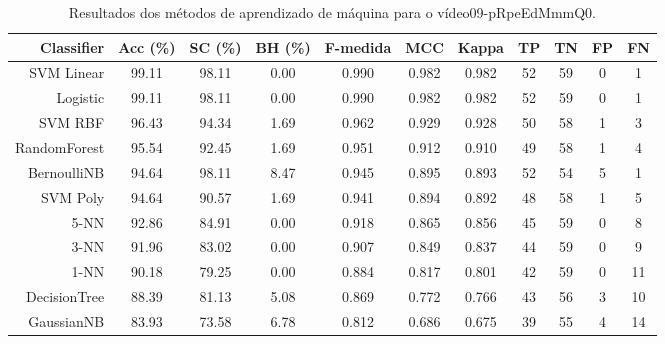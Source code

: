 \begin{table}[!htb]
\centering
\caption{Resultados dos métodos de aprendizado de máquina para o vídeo09-pRpeEdMmmQ0.}
\label{tab:09-pRpeEdMmmQ0}
\begin{tabular}{r|c|c|c|c|c|c|c|c|c|c}
\hline\hline
Classifier & Acc (\%) & SC (\%) & BH (\%) & F-medida & MCC & Kappa & TP & TN & FP & FN \\ \hline
SVM Linear & 99.11 & 98.11 & 0.00 & 0.990 & 0.982 & 0.982 & 52 & 59 & 0 & 1 \\ 
Logistic & 99.11 & 98.11 & 0.00 & 0.990 & 0.982 & 0.982 & 52 & 59 & 0 & 1 \\ 
SVM RBF & 96.43 & 94.34 & 1.69 & 0.962 & 0.929 & 0.928 & 50 & 58 & 1 & 3 \\ 
RandomForest & 95.54 & 92.45 & 1.69 & 0.951 & 0.912 & 0.910 & 49 & 58 & 1 & 4 \\ 
BernoulliNB & 94.64 & 98.11 & 8.47 & 0.945 & 0.895 & 0.893 & 52 & 54 & 5 & 1 \\ 
SVM Poly & 94.64 & 90.57 & 1.69 & 0.941 & 0.894 & 0.892 & 48 & 58 & 1 & 5 \\ 
5-NN & 92.86 & 84.91 & 0.00 & 0.918 & 0.865 & 0.856 & 45 & 59 & 0 & 8 \\ 
3-NN & 91.96 & 83.02 & 0.00 & 0.907 & 0.849 & 0.837 & 44 & 59 & 0 & 9 \\ 
1-NN & 90.18 & 79.25 & 0.00 & 0.884 & 0.817 & 0.801 & 42 & 59 & 0 & 11 \\ 
DecisionTree & 88.39 & 81.13 & 5.08 & 0.869 & 0.772 & 0.766 & 43 & 56 & 3 & 10 \\ 
GaussianNB & 83.93 & 73.58 & 6.78 & 0.812 & 0.686 & 0.675 & 39 & 55 & 4 & 14 \\ 
\hline\hline
\end{tabular}
\end{table}
